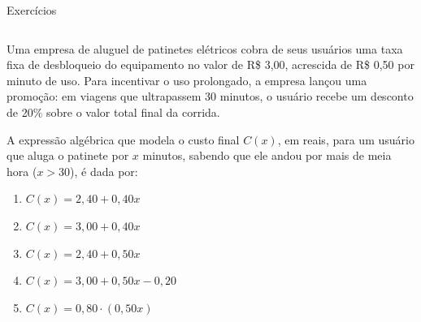 \documentclass[aspectratio=169, t, 8pt]{beamer}
\begin{document}
    \begin{frame}{Exercícios}
        \begin{columns}[totalwidth=.9\textwidth]
            \begin{column}{\textwidth}
                Uma empresa de aluguel de patinetes elétricos cobra de seus usuários uma taxa fixa de desbloqueio do equipamento no valor de R\$ 3,00, acrescida de R\$ 0,50 por minuto de uso. Para incentivar o uso prolongado, a empresa lançou uma promoção: em viagens que ultrapassem 30 minutos, o usuário recebe um desconto de 20\% sobre o valor total final da corrida.
                
                \vspace{1.2em}

                A expressão algébrica que modela o custo final $C(x)$, em reais, para um usuário que aluga o patinete por $x$ minutos, sabendo que ele andou por mais de meia hora ($x > 30$), é dada por:

                \vspace{1.2em}

                \begin{enumerate}[label=\alph*)]
                    \item $C(x)=2,40+0,40x$
                    \item $C(x) = 3,00 + 0,40x$
                    \item $C(x) = 2,40 + 0,50x$
                    \item $C(x) = 3,00 + 0,50x - 0,20$
                    \item $C(x) = 0,80 \cdot (0,50x)$
                \end{enumerate}
            \end{column}
        \end{columns}
    \end{frame}
\end{document}
